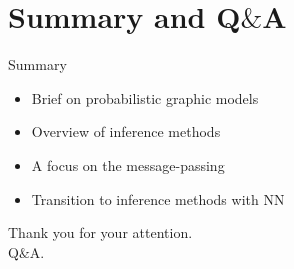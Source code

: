 
\section{Summary and Q$\&$A}
\begin{frame}{Summary}
  \begin{itemize}[label=$\bullet$]
  \item Brief on probabilistic graphic models
  \item Overview of inference methods
  \item A focus on the message-passing
  \item Transition to inference methods with NN
  \end{itemize}
\end{frame}

{ 
  \begin{frame}
    \begin{center}
      {\large Thank you for your attention.}\\
      {\large Q$\&$A.}
    \end{center}
    
  \end{frame}
}


